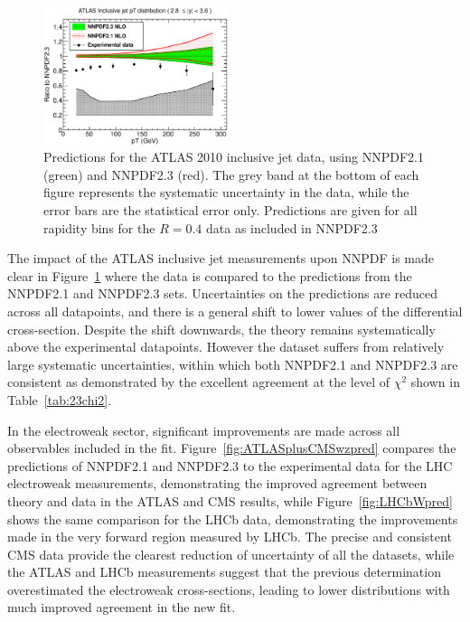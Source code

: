 \begin{figure}[hp]
\includegraphics[width=0.48\textwidth]{6-LHCimpact/figs/ATLASR04JETS36PB_5.eps}
\caption[Predictions for the ATLAS 2010 inclusive jet data, using NNPDF2.1 and NNPDF2.3]{Predictions for the ATLAS 2010 inclusive jet data, using NNPDF2.1 (green) and NNPDF2.3 (red). The grey band at the bottom of each figure represents the systematic uncertainty in the data, while the error bars are the statistical error only. Predictions are given for all rapidity bins for the $R=0.4$ data as included in NNPDF2.3}
\label{fig:ATLASjetspred}
\end{figure}

The impact of the ATLAS inclusive jet measurements upon NNPDF is made clear in Figure~\ref{fig:ATLASjetspred} where the data is compared to the predictions from the NNPDF2.1 and NNPDF2.3 sets. Uncertainties on the predictions are reduced across all datapoints, and there is a general shift to lower values of the differential cross-section. Despite the shift downwards, the theory remains systematically above the experimental datapoints. However the dataset suffers from relatively large systematic uncertainties, within which both NNPDF2.1 and NNPDF2.3 are consistent as demonstrated by the excellent agreement at the level of $\chi^2$ shown in Table~\ref{tab:23chi2}.

In the electroweak sector, significant improvements are made across all observables included in the fit. Figure~\ref{fig:ATLASplusCMSwzpred} compares the predictions of NNPDF2.1 and NNPDF2.3 to the experimental data for the LHC electroweak measurements, demonstrating the improved agreement between theory and data in the ATLAS and CMS results, while Figure~\ref{fig:LHCbWpred} shows the same comparison for the LHCb data, demonstrating the improvements made in the very forward region measured by LHCb. The precise and consistent CMS data provide the clearest reduction of uncertainty of all the datasets, while the ATLAS and LHCb measurements suggest that the previous determination overestimated the electroweak cross-sections, leading to lower distributions with much improved agreement in the new fit.

